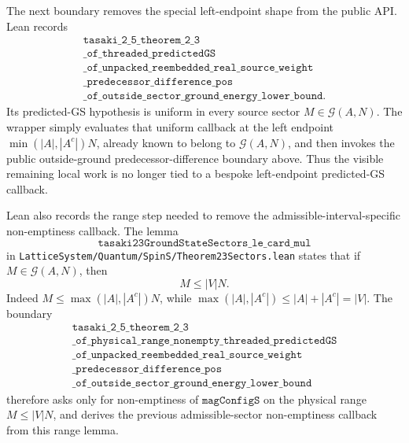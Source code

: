 \documentclass[a4paper,11pt]{article}
\begin{document}
The next boundary removes the special left-endpoint shape from the
public API.  Lean records
\[
\begin{gathered}
\texttt{tasaki\_2\_5\_theorem\_2\_3}\\
\texttt{\_of\_threaded\_predictedGS}\\
\texttt{\_of\_unpacked\_reembedded\_real\_source\_weight}\\
\texttt{\_predecessor\_difference\_pos}\\
\texttt{\_of\_outside\_sector\_ground\_energy\_lower\_bound}.
\end{gathered}
\]
Its predicted-GS hypothesis is uniform in every source sector
\(M\in\mathcal G(A,N)\).  The wrapper simply evaluates that uniform
callback at the left endpoint
\(\min(|A|,|A^c|)N\), already known to belong to
\(\mathcal G(A,N)\), and then invokes the public outside-ground
predecessor-difference boundary above.  Thus the visible remaining local
work is no longer tied to a bespoke left-endpoint predicted-GS callback.

Lean also records the range step needed to remove the
admissible-interval-specific non-emptiness callback.  The lemma
\[
  \texttt{tasaki23GroundStateSectors\_le\_card\_mul}
\]
in \texttt{LatticeSystem/Quantum/SpinS/Theorem23Sectors.lean}
states that if \(M\in\mathcal G(A,N)\), then
\[
  M \le |V|N.
\]
Indeed \(M\le \max(|A|,|A^c|)N\), while
\(\max(|A|,|A^c|)\le |A|+|A^c|=|V|\).  The boundary
\[
\begin{gathered}
\texttt{tasaki\_2\_5\_theorem\_2\_3}\\
\texttt{\_of\_physical\_range\_nonempty\_threaded\_predictedGS}\\
\texttt{\_of\_unpacked\_reembedded\_real\_source\_weight}\\
\texttt{\_predecessor\_difference\_pos}\\
\texttt{\_of\_outside\_sector\_ground\_energy\_lower\_bound}
\end{gathered}
\]
therefore asks only for non-emptiness of \(\texttt{magConfigS}\) on
the physical range \(M\le |V|N\), and derives the previous
admissible-sector non-emptiness callback from this range lemma.
\end{document}
